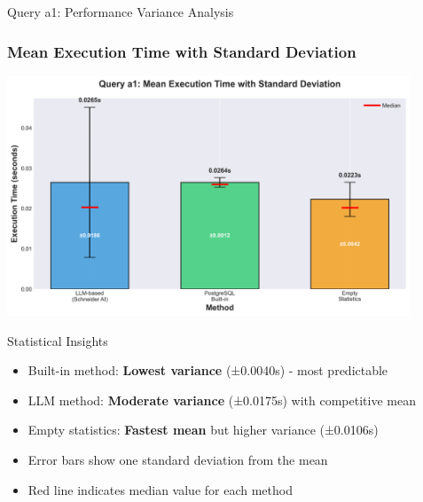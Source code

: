 \documentclass{beamer}
\begin{document}
\begin{frame}{Query a1: Performance Variance Analysis}
\frametitle{Mean Execution Time with Standard Deviation}

\begin{center}
\includegraphics[width=0.9\textwidth]{images/a1_execution_time_barplot.png}
\end{center}

\begin{block}{Statistical Insights}
\begin{itemize}
    \item Built-in method: \textbf{Lowest variance} (±0.0040s) - most predictable
    \item LLM method: \textbf{Moderate variance} (±0.0175s) with competitive mean
    \item Empty statistics: \textbf{Fastest mean} but higher variance (±0.0106s)
    \item Error bars show one standard deviation from the mean
    \item Red line indicates median value for each method
\end{itemize}
\end{block}

\end{frame}
\end{document}
